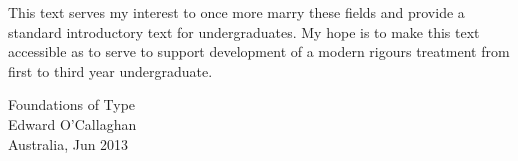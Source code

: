 This text serves my interest to once more marry these fields and provide a
standard introductory text for undergraduates. My hope is to make this text
accessible as to serve to support development of a modern rigours treatment
from first to third year undergraduate.



\bigskip

\begin{flushright}
Foundations of Type\\
Edward O'Callaghan\\
Australia, Jun 2013
\end{flushright}
